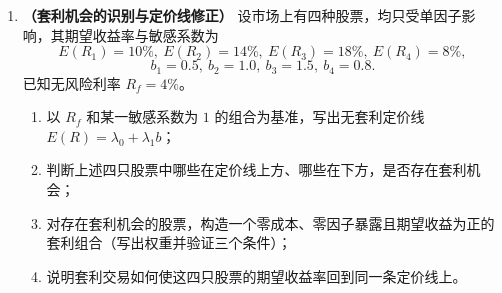\documentclass{article}
\begin{document}
\begin{enumerate}[label=\textbf{\arabic*.}]
\item \textbf{（套利机会的识别与定价线修正）}
设市场上有四种股票，均只受单因子影响，其期望收益率与敏感系数为
\[
E(R_1)=10\%,\ E(R_2)=14\%,\ E(R_3)=18\%,\ E(R_4)=8\%,
\]
\[
b_1=0.5,\ b_2=1.0,\ b_3=1.5,\ b_4=0.8.
\]
已知无风险利率 $R_f=4\%$。
\begin{enumerate}[label=(\arabic*)]
    \item 以 $R_f$ 和某一敏感系数为 $1$ 的组合为基准，写出无套利定价线 $E(R)=\lambda_0+\lambda_1 b$；
    \item 判断上述四只股票中哪些在定价线上方、哪些在下方，是否存在套利机会；
    \item 对存在套利机会的股票，构造一个零成本、零因子暴露且期望收益为正的套利组合（写出权重并验证三个条件）；
    \item 说明套利交易如何使这四只股票的期望收益率回到同一条定价线上。
\end{enumerate}



\end{enumerate}
\end{document}
